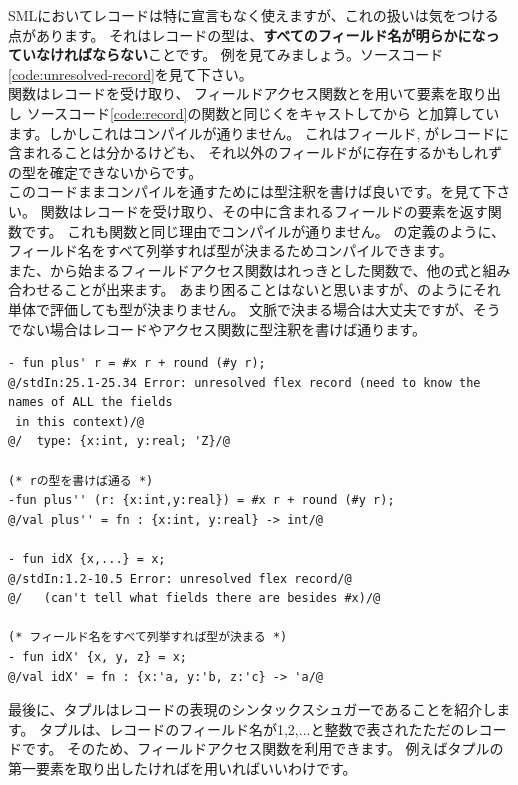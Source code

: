 \documentclass[11pt,a4paper]{article}
\begin{document}
SMLにおいてレコードは特に宣言もなく使えますが、これの扱いは気をつける点があります。
それはレコードの型は、\textbf{すべてのフィールド名が明らかになっていなければならない}ことです。
例を見てみましょう。ソースコード\ref{code:unresolved-record}を見て下さい。\\
関数はレコードを受け取り、
フィールドアクセス関数とを用いて要素を取り出し
ソースコード\ref{code:record}の関数と同じくをキャストしてから
と加算しています。しかしこれはコンパイルが通りません。
これはフィールド, がレコードに含まれることは分かるけども、
それ以外のフィールドがに存在するかもしれずの型を確定できないからです。\\
このコードままコンパイルを通すためには型注釈を書けば良いです。を見て下さい。
関数はレコードを受け取り、その中に含まれるフィールドの要素を返す関数です。
これも関数と同じ理由でコンパイルが通りません。
の定義のように、フィールド名をすべて列挙すれば型が決まるためコンパイルできます。\\
また、\prog{#}から始まるフィールドアクセス関数はれっきとした関数で、他の式と組み合わせることが出来ます。
あまり困ることはないと思いますが、のようにそれ単体で評価しても型が決まりません。
文脈で決まる場合は大丈夫ですが、そうでない場合はレコードやアクセス関数に型注釈を書けば通ります。

\begin{lstlisting}[caption=フィールド名が解決出来ない例,label=code:unresolved-record]
- fun plus' r = #x r + round (#y r);
@/stdIn:25.1-25.34 Error: unresolved flex record (need to know the names of ALL the fields
 in this context)/@
@/  type: {x:int, y:real; 'Z}/@

(* rの型を書けば通る *)
-fun plus'' (r: {x:int,y:real}) = #x r + round (#y r);
@/val plus'' = fn : {x:int, y:real} -> int/@

- fun idX {x,...} = x;
@/stdIn:1.2-10.5 Error: unresolved flex record/@
@/   (can't tell what fields there are besides #x)/@

(* フィールド名をすべて列挙すれば型が決まる *)
- fun idX' {x, y, z} = x;
@/val idX' = fn : {x:'a, y:'b, z:'c} -> 'a/@
\end{lstlisting}

最後に、タプルはレコードの表現のシンタックスシュガーであることを紹介します。
タプルは、レコードのフィールド名が1,2,...と整数で表されたただのレコードです。
そのため、フィールドアクセス関数を利用できます。
例えばタプルの第一要素を取り出したければを用いればいいわけです。
\end{document}
